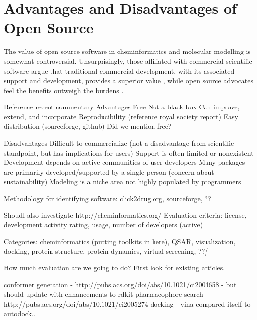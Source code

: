 \section*{Advantages and Disadvantages of Open Source}

The value of open source software in cheminformatics and molecular modelling is somewhat controversial.  Unsurprisingly, those affiliated with commercial scientific software argue that traditional commercial development, with its associated support and development, provides a superior value \cite{Krylov_2015}, while open source advocates feel the benefits outweigh the burdens \cite{Gezelter_2015,Jacob_2016}.

Reference recent commentary 
Advantages 
Free
Not a black box 
Can improve, extend, and incorporate
Reproducibility (reference royal society report)
Easy distribution (sourceforge, github)
Did we mention free?

Disadvantages
Difficult to commercialize (not a disadvantage from scientific standpoint, but has implications for users)
Support is often limited or nonexistent 
Development depends on active communities of user-developers 
Many packages are primarily developed/supported by a single person (concern about sustainability)
Modeling is a niche area not highly populated by programmers

Methodology for identifying software: click2drug.org, sourceforge, ??

Shoudl also investigate http://cheminformatics.org/
Evaluation criteria: license, development activity rating, usage, number of developers (active)

Categories:
 cheminformatics (putting toolkits in here), QSAR, visualization, docking, protein structure, protein dynamics, virtual screening, ??/
 
 
 How much evaluation are we going to do?  First look for existing articles.
 
 conformer generation - http://pubs.acs.org/doi/abs/10.1021/ci2004658 - but should update with enhancements to rdkit
 pharmacophore search - http://pubs.acs.org/doi/abs/10.1021/ci2005274
 docking - vina compared itself to autodock..
  
  
  \cite{Koes_2011}
  